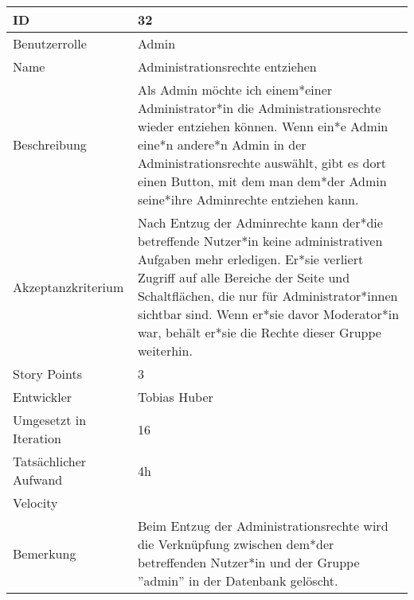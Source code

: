 \begin{tabularx}{\textwidth}{|p{}|X|}
	\hline
	ID & 32 \\
	\hline
	Benutzerrolle & Admin \\
	\hline
	Name & Administrationsrechte entziehen\\
	\hline
	Beschreibung & Als Admin möchte ich einem*einer Administrator*in die Administrationsrechte wieder entziehen können. Wenn ein*e Admin eine*n andere*n Admin in der Administrationsrechte auswählt, gibt es dort einen Button, mit dem man dem*der Admin seine*ihre Adminrechte entziehen kann.  \\
	\hline
	Akzeptanzkriterium & Nach Entzug der Adminrechte kann der*die betreffende Nutzer*in keine administrativen Aufgaben mehr erledigen. Er*sie verliert Zugriff auf alle Bereiche der Seite und Schaltflächen, die nur für Administrator*innen sichtbar sind. Wenn er*sie davor Moderator*in war, behält er*sie die Rechte dieser Gruppe weiterhin. \\
	\hline
	Story Points & 3 \\
	\hline
	Entwickler & Tobias Huber \\
	\hline
	Umgesetzt in Iteration & 16\\
	\hline
	Tatsächlicher Aufwand & 4h\\
	\hline
	Velocity & \\
	\hline
	Bemerkung & Beim Entzug der Administrationsrechte wird die Verknüpfung zwischen dem*der betreffenden Nutzer*in und der Gruppe ''admin'' in der Datenbank gelöscht.\\
	\hline
\end{tabularx}
\vspace{20pt}
